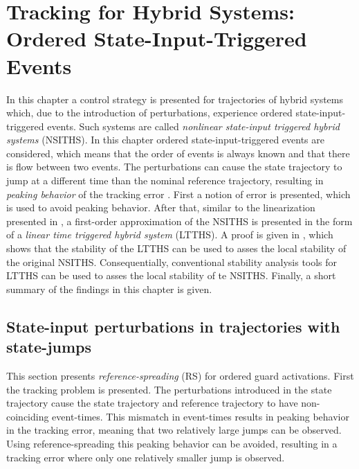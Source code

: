 \documentclass[../DC2017114Bouma.tex]{subfiles}
\begin{document}
\graphicspath{{03_Contribution/img/}}
\renewcommand{\chaptermark}[1]{\markboth{\thechapter.\ #1}{}}
\renewcommand{\sectionmark}[1]{\markright{#1}{}}

\pagestyle{fancyreport}
\cleartooddpage
\pagestyle{fancyreport}
\chapter{Tracking for Hybrid Systems: Ordered State-Input-Triggered Events}\label{ch:order}
In this chapter a control strategy is presented for trajectories of hybrid systems which, due to the introduction of perturbations, experience ordered state-input-triggered events. Such systems are called \textit{nonlinear state-input triggered hybrid systems} (NSITHS). In this chapter ordered state-input-triggered events are considered, which means that the order of events is always known and that there is flow between two events. The perturbations can cause the state trajectory to jump at a different time than the nominal reference trajectory, resulting in \textit{peaking behavior} of the tracking error \cite{Menini2001,Biemond2013}. First a notion of error \cite{Rijnen2017} is presented, which is used to avoid peaking behavior. After that, similar to the linearization presented in \cite{Rijnen2017}, a first-order approximation of the NSITHS is presented in the form of a \textit{linear time triggered hybrid system} (LTTHS). A proof is given in \cite{Rijnen2017}, which shows that the stability of the LTTHS can be used to asses the local stability of the original NSITHS. Consequentially, conventional stability analysis tools for LTTHS can be used to asses the local stability of te NSITHS. Finally, a short summary of the findings in this chapter is given.
%
%

\section{State-input perturbations in trajectories with state-jumps}
This section presents \textit{reference-spreading} (RS) for ordered guard activations. First the tracking problem is presented. The perturbations introduced in the state trajectory cause the state trajectory and reference trajectory to have non-coinciding event-times. This mismatch in event-times results in peaking behavior in the tracking error, meaning that two relatively large jumps can be observed. Using reference-spreading this peaking behavior can be avoided, resulting in a tracking error where only one relatively smaller jump is observed.
%
\end{document}

